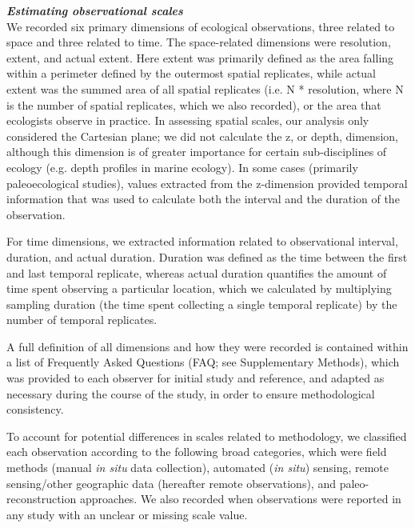 \documentclass[12pt]{article}
\begin{document}
\vspace{5pt}
\noindent \textbf{\emph{Estimating observational scales}}\\
We recorded six primary dimensions of ecological observations, three related to space and three related to time. The space-related dimensions were resolution, extent, and actual extent. Here extent was primarily defined as the area falling within a perimeter defined by the outermost spatial replicates, while actual extent was  the summed area of all spatial replicates (i.e. N * resolution, where N is the number of spatial replicates, which we also recorded), or the area that ecologists observe in practice. In assessing spatial scales, our analysis only considered the Cartesian plane; we did not calculate the z, or depth, dimension, although this dimension is of greater importance for certain sub-disciplines of ecology (e.g. depth profiles in marine ecology). In some cases (primarily paleoecological studies), values extracted from the z-dimension provided temporal information that was used to calculate both the interval and the duration of the observation.  

For time dimensions, we extracted information related to observational interval, duration, and actual duration. Duration was defined as the time between the first and last temporal replicate, whereas actual duration quantifies the amount of time spent observing a particular location, which we calculated by multiplying sampling duration (the time spent collecting a single temporal replicate) by the number of temporal replicates.  

A full definition of all dimensions and how they were recorded is contained within a list of Frequently Asked Questions (FAQ; see Supplementary Methods), which was provided to each observer for initial study and reference, and adapted as necessary during the course of the study, in order to ensure methodological consistency.  

To account for potential differences in scales related to methodology, we classified each observation according to the following broad categories, which were field methods (manual \emph{in situ} data collection), automated (\emph{in situ}) sensing, remote sensing/other geographic data (hereafter remote observations), and paleo-reconstruction approaches. We also recorded when observations were reported in any study with an unclear or missing scale value.  
\end{document}
